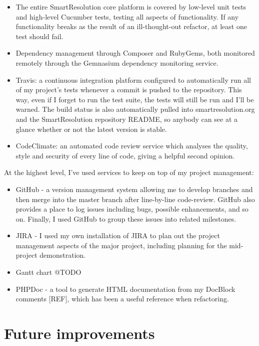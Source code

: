 \begin{itemize}
\item The entire SmartResolution core platform is covered by low-level unit tests and high-level Cucumber tests, testing all aspects of functionality. If any functionality breaks as the result of an ill-thought-out refactor, at least one test should fail.
\item Dependency management through Composer and RubyGems, both monitored remotely through the Gemnasium dependency monitoring service.
\item Travis: a continuous integration platform configured to automatically run all of my project's tests whenever a commit is pushed to the repository. This way, even if I forget to run the test suite, the tests will still be run and I'll be warned. The build status is also automatically pulled into smartresolution.org and the SmartResolution repository README, so anybody can see at a glance whether or not the latest version is stable.
\item CodeClimate: an automated code review service which analyses the quality, style and security of every line of code, giving a helpful second opinion.
\end{itemize}

At the highest level, I've used services to keep on top of my project management:

\begin{itemize}
\item GitHub - a version management system allowing me to develop branches and then merge into the master branch after line-by-line code-review. GitHub also provides a place to log issues including bugs, possible enhancements, and so on. Finally, I used GitHub to group these issues into related milestones.
\item JIRA - I used my own installation of JIRA to plan out the project management aspects of the major project, including planning for the mid-project demonstration.
\item Gantt chart @TODO
\item PHPDoc - a tool to generate HTML documentation from my DocBlock comments [REF], which has been a useful reference when refactoring.
\end{itemize}

\section{Future improvements}

